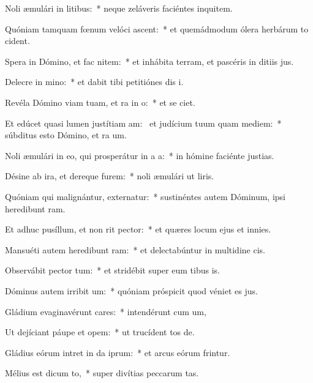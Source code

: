 \item Noli æmulári in litibus:~* neque zeláveris faciéntes inquitem.
\item Quóniam tamquam fœnum velóci ascent:~* et quemádmodum ólera herbárum to cident.
\item Spera in Dómino, et fac nitem:~* et inhábita terram, et pascéris in ditiis jus.
\item Delecre in mino:~* et dabit tibi petitiónes dis i.
\item Revéla Dómino viam tuam, et ra in o:~* et se ciet.
\item Et edúcet quasi lumen justítiam am:~\pscross{} et judícium tuum quam mediem:~* súbditus esto Dómino, et ra um.
\item Noli æmulári in eo, qui prosperátur in a a:~* in hómine faciénte justias.
\item Désine ab ira, et dereque furem:~* noli æmulári ut liris.
\item Quóniam qui malignántur, externatur:~* sustinéntes autem Dóminum, ipsi heredibunt ram.
\item Et adhuc pusíllum, et non rit pector:~* et quæres locum ejus et  innies.
\item Mansuéti autem heredibunt ram:~* et delectabúntur in multidine cis.
\item Observábit pector tum:~* et stridébit super eum tibus is.
\item Dóminus autem irribit um:~* quóniam próspicit quod véniet es jus.
\item Gládium evaginavérunt cares:~* intendérunt cum um,
\item Ut dejíciant páupe et opem:~* ut trucídent tos de.
\item Gládius eórum intret in da iprum:~* et arcus eórum frintur.
\item Mélius est dicum to,~* super divítias peccarum tas.
